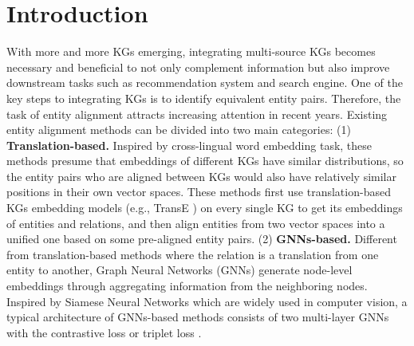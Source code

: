 \documentclass[sigconf,camera-ready]{acmart}
\begin{document}






\maketitle

\section{Introduction}
\label{sec:intro}
With more and more KGs emerging, integrating multi-source KGs becomes necessary and beneficial to not only complement information but also improve downstream tasks such as recommendation system and search engine.
One of the key steps to integrating KGs is to identify equivalent entity pairs.
Therefore, the task of entity alignment attracts increasing attention in recent years.
Existing entity alignment methods can be divided into two main categories:
(1) \textbf{Translation-based.}
Inspired by cross-lingual word embedding task, these methods presume that embeddings of different KGs have similar distributions, so the entity pairs who are aligned between KGs would also have relatively similar positions in their own vector spaces.
These methods \cite{DBLP:conf/ijcai/ChenTYZ17,DBLP:conf/semweb/SunHL17,DBLP:conf/ijcai/SunHZQ18,DBLP:conf/icml/GuoSH19} first use translation-based KGs embedding models (e.g., TransE \cite{DBLP:conf/nips/BordesUGWY13}) on every single KG to get its embeddings of entities and relations, and then align entities from two vector spaces into a unified one based on some pre-aligned entity pairs.
(2) \textbf{GNNs-based.}
Different from translation-based methods where the relation is a translation from one entity to another, Graph Neural Networks (GNNs) generate node-level embeddings through aggregating information from the neighboring nodes.
Inspired by Siamese Neural Networks \cite{DBLP:conf/cvpr/ChopraHL05} which are widely used in computer vision, a typical architecture of GNNs-based methods \cite{DBLP:conf/acl/CaoLLLLC19,sun2019knowledge,DBLP:conf/emnlp/WangLLZ18} consists of two multi-layer GNNs with the contrastive loss \cite{DBLP:conf/cvpr/HadsellCL06} or triplet loss \cite{DBLP:conf/cvpr/SchroffKP15}.
\end{document}

